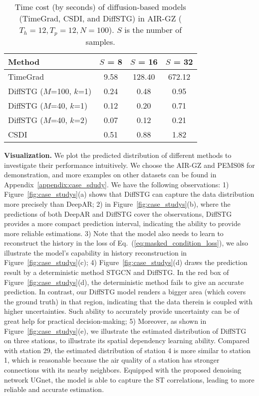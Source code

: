 {\begin{table}[h]
    \caption{Time cost (by seconds) of diffusion-based models (TimeGrad, CSDI, and DiffSTG) in AIR-GZ ($T_h=12, T_p=12, N = 100$). $S$ is the number of samples.}
    \centering
    \setlength\tabcolsep{10pt}
	\begin{tabular}{l|ccc}
		\toprule
		Method & $S$ = 8 &  $S$ = 16  &   $S$ = 32     \\ 
		\midrule
		TimeGrad \cite{rasul2021autoregressive} &  9.58   &   128.40    & 672.12      \\
        DiffSTG ($M$=100, $k$=1)  &  0.24  &   0.48    & 0.95    \\
        DiffSTG ($M$=40, $k$=1)  &  0.12  &   0.20    & 0.71    \\
        DiffSTG ($M$=40, $k$=2)  &  0.07  &   0.12    & 0.21   \\
        CSDI   &  0.51  &   0.88    & 1.82   \\
		\bottomrule
	\end{tabular}
	\label{tab:time_cost}

\end{table}

\textbf{Visualization.} We plot the predicted distribution of different methods to investigate their performance intuitively. 
 We choose the AIR-GZ and PEMS08 for demonstration, and more examples on other datasets can be found in Appendix~\ref{appendix:case_sdudy}. We have the following observations: 1) Figure~\ref{fig:case_studys}(a) shows that DiffSTG can capture the data distribution more precisely than DeepAR; 2) in Figure~\ref{fig:case_studys}(b), where the predictions of both DeepAR and DiffSTG cover the observations, DiffSTG provides a more compact prediction interval, indicating the ability to provide more reliable estimations. 3) Note that the model also needs to learn to reconstruct the history in the loss of Eq.~(\ref{eq:masked_condition_loss}), we also illustrate the model's capability in history reconstruction in Figure~\ref{fig:case_studys}(c); 4) Figure~\ref{fig:case_studys}(d) draws the prediction result by a deterministic method STGCN \cite{STGCN-2018} and DiffSTG. In the red box of Figure~\ref{fig:case_studys}(d), the deterministic method fails to give an accurate prediction. In contrast, our DiffSTG model renders a bigger area (which covers the ground truth) in that region, indicating that the data therein is coupled with higher uncertainties. Such ability to accurately provide uncertainty can be of great help for practical decision-making; 5) Moreover, as shown in Figure~\ref{fig:case_studys}(e), we illustrate the estimated distribution of DiffSTG on three stations, to illustrate its spatial dependency learning ability. Compared with station 29, the estimated distribution of station 4 is more similar to station 1, which is reasonable because the air quality of a station has stronger connections with its nearby neighbors. Equipped with the proposed denoising network UGnet, the model is able to capture the ST correlations, leading to more reliable and accurate estimation.  
 

}
